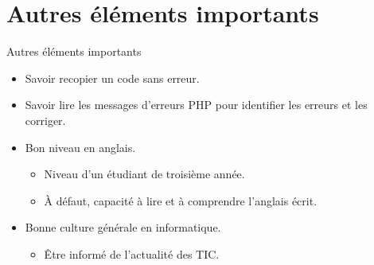 \documentclass{beamer}
\begin{document}
\section{Autres éléments importants}
\begin{frame}{Autres éléments importants}
\begin{itemize}
  \item Savoir recopier un code sans erreur.
  \item Savoir lire les messages d'erreurs PHP pour identifier les erreurs et les corriger.
  \item Bon niveau en anglais.
  \begin{itemize}
    \item Niveau d'un étudiant de troisième année.
    \item \`{A} défaut, capacité à lire et à comprendre l'anglais écrit.
  \end{itemize}
  \item Bonne culture générale en informatique.
  \begin{itemize}
    \item Être informé de l'actualité des TIC.
  \end{itemize}
\end{itemize}
\end{frame}
\end{document}
